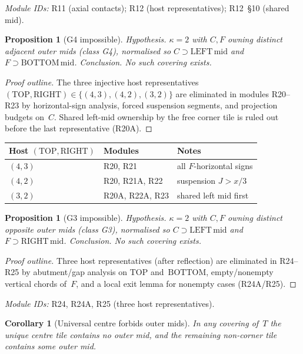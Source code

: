 \documentclass[11pt,reqno]{amsart}
\newtheorem{proposition}[theorem]{Proposition}
\newtheorem{corollary}[theorem]{Corollary}
\theoremstyle{definition}
\newcommand{\BOTTOM}{\mathrm{BOTTOM}}
\newcommand{\RIGHT}{\mathrm{RIGHT}}
\newcommand{\TOP}{\mathrm{TOP}}
\begin{document}
\noindent\textit{Module IDs:} R11 (axial contacts); R12 (host representatives);
R12~\S10 (shared mid).

\begin{proposition}[G4 impossible]\label{prop:M51}
\emph{Hypothesis.} $\kappa=2$ with $C,F$ owning distinct \emph{adjacent} outer mids
(class G4), normalised so $C\supset\mathrm{LEFT\,mid}$ and
$F\supset\mathrm{BOTTOM\,mid}$.
\emph{Conclusion.} No such covering exists.
\end{proposition}

\begin{proof}[Proof outline]
The three injective host representatives
$(\TOP,\RIGHT)\in\{(4,3),(4,2),(3,2)\}$ are eliminated in modules R20--R23 by
horizontal-sign analysis, forced suspension segments, and projection budgets
on~$C$.  Shared left-mid ownership by the free corner tile is ruled out before
the last representative (R20A).
\end{proof}

\begin{center}
\small
\begin{tabular}{@{}lll@{}}
\toprule
Host $(\TOP,\RIGHT)$ & Modules & Notes \\
\midrule
$(4,3)$ & R20, R21 & all $F$-horizontal signs \\
$(4,2)$ & R20, R21A, R22 & suspension $J>x/3$ \\
$(3,2)$ & R20A, R22A, R23 & shared left mid first \\
\bottomrule
\end{tabular}
\end{center}

\begin{proposition}[G3 impossible]\label{prop:M52}
\emph{Hypothesis.} $\kappa=2$ with $C,F$ owning distinct \emph{opposite} outer mids
(class G3), normalised so $C\supset\mathrm{LEFT\,mid}$ and
$F\supset\mathrm{RIGHT\,mid}$.
\emph{Conclusion.} No such covering exists.
\end{proposition}

\begin{proof}[Proof outline]
Three host representatives (after reflection) are eliminated in R24--R25 by
abutment/gap analysis on $\TOP$ and~$\BOTTOM$, empty/nonempty vertical chords
of~$F$, and a local exit lemma for nonempty cases (R24A/R25).
\end{proof}

\noindent\textit{Module IDs:} R24, R24A, R25 (three host representatives).

\begin{corollary}[Universal centre forbids outer mids]\label{cor:M53}
In any covering of~$T$ the unique centre tile contains no outer mid, and the
remaining non-corner tile contains some outer mid.
\end{corollary}
\end{document}
